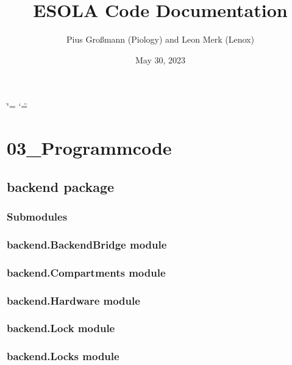 \documentclass[letterpaper,12pt,english]{sphinxmanual}
\title{ESOLA Code Documentation}
\date{May 30, 2023}
\author{Pius Großmann (Piology) and Leon Merk (Lenox)}
\begin{document}
\ifdefined\shorthandoff
  \ifnum\catcode`\=\string=\active\shorthandoff{=}\fi
  \ifnum\catcode`\"=\active{}\fi
\fi

\pagestyle{empty}
\sphinxmaketitle
\pagestyle{plain}
\sphinxtableofcontents
\pagestyle{normal}
\label{\detokenize{index::doc}}


\sphinxstepscope


\chapter{03\_Programmcode}
\label{\detokenize{modules:programmcode}}\label{\detokenize{modules::doc}}
\sphinxstepscope


\section{backend package}
\label{\detokenize{backend:backend-package}}\label{\detokenize{backend::doc}}

\subsection{Submodules}
\label{\detokenize{backend:submodules}}

\subsection{backend.BackendBridge module}
\label{\detokenize{backend:backend-backendbridge-module}}

\subsection{backend.Compartments module}
\label{\detokenize{backend:backend-compartments-module}}

\subsection{backend.Hardware module}
\label{\detokenize{backend:backend-hardware-module}}

\subsection{backend.Lock module}
\label{\detokenize{backend:backend-lock-module}}

\subsection{backend.Locks module}
\label{\detokenize{backend:backend-locks-module}}
\end{document}
